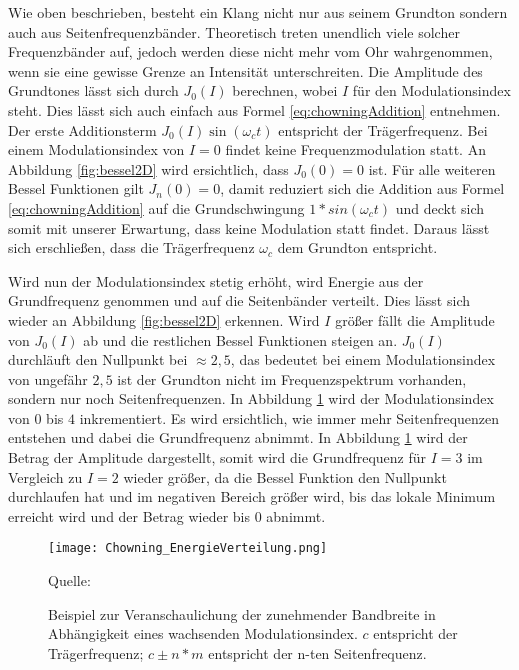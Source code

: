 Wie oben beschrieben, besteht ein Klang nicht nur aus seinem Grundton sondern auch aus Seitenfrequenzbänder. Theoretisch treten unendlich viele solcher Frequenzbänder auf, jedoch werden diese nicht mehr vom Ohr wahrgenommen, wenn sie eine gewisse Grenze an Intensität unterschreiten. Die Amplitude des Grundtones lässt sich durch $J_0(I)$ berechnen, wobei $I$ für den Modulationsindex steht. Dies lässt sich auch einfach aus Formel \ref{eq:chowningAddition} entnehmen. Der erste Additionsterm $J_0(I)\sin(\omega_c t)$ entspricht der Trägerfrequenz. Bei einem Modulationsindex von $I=0$ findet keine Frequenzmodulation statt. An Abbildung \ref{fig:bessel2D} wird ersichtlich, dass $J_0(0)=0$ ist. Für alle weiteren Bessel Funktionen gilt $J_n(0)=0$, damit reduziert sich die Addition aus Formel \ref{eq:chowningAddition} auf die Grundschwingung $1*sin(\omega_c t)$ und deckt sich somit mit unserer Erwartung, dass keine Modulation statt findet. Daraus lässt sich erschließen, dass die Trägerfrequenz $\omega_c$ dem Grundton entspricht.

\label{bulli:besselModIndexZusammenahang}
Wird nun der Modulationsindex stetig erhöht, wird Energie aus der Grundfrequenz genommen und auf die Seitenbänder verteilt. Dies lässt sich wieder an Abbildung \ref{fig:bessel2D} erkennen. Wird $I$ größer fällt die Amplitude von $J_0(I)$ ab und die restlichen Bessel Funktionen steigen an. $J_0(I)$ durchläuft den Nullpunkt bei $\approx2,5$, das bedeutet bei einem Modulationsindex von ungefähr $2,5$ ist der Grundton nicht im Frequenzspektrum vorhanden, sondern nur noch Seitenfrequenzen. In Abbildung \ref{fig:chowningEnergieVerteilung} wird der Modulationsindex von $0$ bis $4$ inkrementiert. Es wird ersichtlich, wie immer mehr Seitenfrequenzen entstehen und dabei die Grundfrequenz abnimmt. In Abbildung \ref{fig:chowningEnergieVerteilung} wird der Betrag der Amplitude dargestellt, somit wird die Grundfrequenz für $I=3$ im Vergleich zu $I=2$ wieder größer, da die Bessel Funktion den Nullpunkt durchlaufen hat und im negativen Bereich größer wird, bis das lokale Minimum erreicht wird und der Betrag wieder bis $0$ abnimmt.

\begin{figure} [ht]
\centering
  \texttt{[image: Chowning\_EnergieVerteilung.png]}
\caption{Beispiel zur Veranschaulichung der zunehmender Bandbreite in Abhängigkeit eines wachsenden Modulationsindex. $c$ entspricht der Trägerfrequenz; $c\pm n*m$ entspricht der n-ten Seitenfrequenz.}
\label{fig:chowningEnergieVerteilung}
Quelle: \cite{chowningPaper}
\end{figure}



